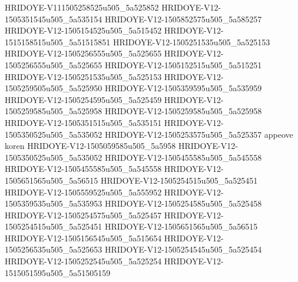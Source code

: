 HRIDOYE-V111505258525u505_5a525852
HRIDOYE-V12-1505351545u505_5a535154
HRIDOYE-V12-1505852575u505_5a585257 
HRIDOYE-V12-1505154525u505_5a515452
HRIDOYE-V12-1515158515u505_5a51515851
HRIDOYE-V12-1505251535u505_5a525153
HRIDOYE-V12-1505256555u505_5a525655
HRIDOYE-V12-1505256555u505_5a525655
HRIDOYE-V12-1505152515u505_5a515251
HRIDOYE-V12-1505251535u505_5a525153
HRIDOYE-V12-1505259505u505_5a525950
HRIDOYE-V12-1505359595u505_5a535959
HRIDOYE-V12-1505254595u505_5a525459
HRIDOYE-V12-1505259585u505_5a525958
HRIDOYE-V12-1505259585u505_5a525958
HRIDOYE-V12-1505351515u505_5a535151
HRIDOYE-V12-1505350525u505_5a535052
HRIDOYE-V12-1505253575u505_5a525357
appeove koren
HRIDOYE-V12-1505059585u505_5a5958
HRIDOYE-V12-1505350525u505_5a535052
HRIDOYE-V12-1505455585u505_5a545558
HRIDOYE-V12-1505455585u505_5a545558
HRIDOYE-V12-1505651565u505_5a56515
HRIDOYE-V12-1505254515u505_5a525451
HRIDOYE-V12-1505559525u505_5a555952
HRIDOYE-V12-1505359535u505_5a535953
HRIDOYE-V12-1505254585u505_5a525458
HRIDOYE-V12-1505254575u505_5a525457
HRIDOYE-V12-1505254515u505_5a525451
HRIDOYE-V12-1505651565u505_5a56515
HRIDOYE-V12-1505156545u505_5a515654
HRIDOYE-V12-1505256535u505_5a525653
HRIDOYE-V12-1505254545u505_5a525454
HRIDOYE-V12-1505252545u505_5a525254
HRIDOYE-V12-1515051595u505_5a51505159
